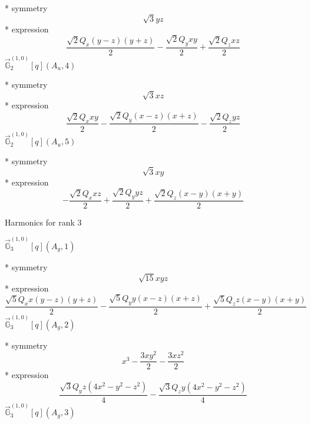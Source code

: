 \documentclass[fleqn,8pt]{jsarticle}
\begin{document}
\noindent\quad ** symmetry
\begin{dmath*}
\sqrt{3} y z
\end{dmath*}
\noindent\quad ** expression
\begin{dmath*}
\frac{\sqrt{2} Q_{x} \left(y - z\right) \left(y + z\right)}{2} - \frac{\sqrt{2} Q_{y} x y}{2} + \frac{\sqrt{2} Q_{z} x z}{2}
\end{dmath*}
\noindent\quad $\vec{\mathbb{G}}_{2}^{(1,0)}[q](A_{u},4)$

\noindent\quad ** symmetry
\begin{dmath*}
\sqrt{3} x z
\end{dmath*}
\noindent\quad ** expression
\begin{dmath*}
\frac{\sqrt{2} Q_{x} x y}{2} - \frac{\sqrt{2} Q_{y} \left(x - z\right) \left(x + z\right)}{2} - \frac{\sqrt{2} Q_{z} y z}{2}
\end{dmath*}
\noindent\quad $\vec{\mathbb{G}}_{2}^{(1,0)}[q](A_{u},5)$

\noindent\quad ** symmetry
\begin{dmath*}
\sqrt{3} x y
\end{dmath*}
\noindent\quad ** expression
\begin{dmath*}
- \frac{\sqrt{2} Q_{x} x z}{2} + \frac{\sqrt{2} Q_{y} y z}{2} + \frac{\sqrt{2} Q_{z} \left(x - y\right) \left(x + y\right)}{2}
\end{dmath*}

\noindent * Harmonics for rank 3

\noindent\quad $\vec{\mathbb{G}}_{3}^{(1,0)}[q](A_{g},1)$

\noindent\quad ** symmetry
\begin{dmath*}
\sqrt{15} x y z
\end{dmath*}
\noindent\quad ** expression
\begin{dmath*}
\frac{\sqrt{5} Q_{x} x \left(y - z\right) \left(y + z\right)}{2} - \frac{\sqrt{5} Q_{y} y \left(x - z\right) \left(x + z\right)}{2} + \frac{\sqrt{5} Q_{z} z \left(x - y\right) \left(x + y\right)}{2}
\end{dmath*}
\noindent\quad $\vec{\mathbb{G}}_{3}^{(1,0)}[q](A_{g},2)$

\noindent\quad ** symmetry
\begin{dmath*}
x^{3} - \frac{3 x y^{2}}{2} - \frac{3 x z^{2}}{2}
\end{dmath*}
\noindent\quad ** expression
\begin{dmath*}
\frac{\sqrt{3} Q_{y} z \left(4 x^{2} - y^{2} - z^{2}\right)}{4} - \frac{\sqrt{3} Q_{z} y \left(4 x^{2} - y^{2} - z^{2}\right)}{4}
\end{dmath*}
\noindent\quad $\vec{\mathbb{G}}_{3}^{(1,0)}[q](A_{g},3)$
\end{document}
